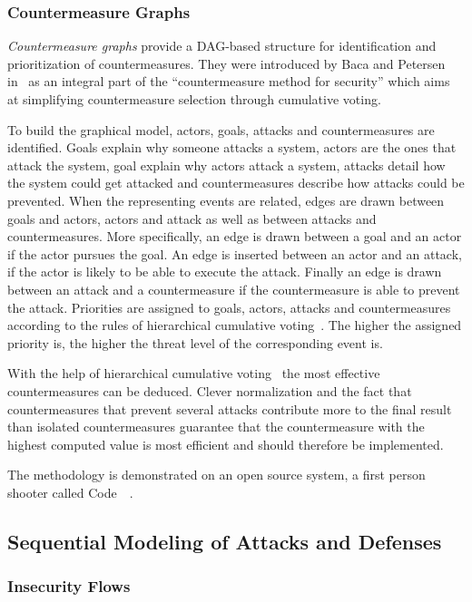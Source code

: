 \documentclass[a4paper]{article}
\begin{document}
\subsubsection{Countermeasure Graphs} 
\label{sec:countermeausre_graphs}

\emph{Countermeasure graphs} provide a DAG-based structure for identification
and prioritization of countermeasures. They were introduced by Baca and
Petersen~\cite{BaPe} in~ as an integral part of the ``countermeasure
method for security'' which aims at simplifying countermeasure selection through
cumulative voting.

To build the graphical model, actors, goals, attacks and countermeasures are
identified. Goals explain why someone attacks a system, actors are the ones 
that attack the system, goal explain why actors attack a system, attacks detail 
how the system could get attacked and countermeasures describe how attacks 
could be prevented. When the representing events are related, edges are drawn 
between goals and actors, actors and attack as well as between attacks and 
countermeasures. More specifically, an edge is drawn between a goal and an 
actor if the actor pursues the goal. An edge is inserted between an actor
and an attack, if the actor is likely to be able to execute the attack. Finally 
an edge is drawn between an attack and a countermeasure if the countermeasure 
is able to prevent the attack. Priorities are assigned to goals, actors, 
attacks and countermeasures according to the rules of hierarchical cumulative 
voting~\cite{BeSv}. The higher the assigned priority is, the higher the threat 
level of the corresponding event is.

With the help of hierarchical cumulative voting~\cite{BeSv} the most effective
countermeasures can be deduced. Clever normalization and the fact that
countermeasures that prevent several attacks contribute more to the final
result than isolated countermeasures guarantee that the countermeasure with
the highest computed value is most efficient and should therefore be
implemented.

The methodology is demonstrated on an open source system, a first person 
shooter called Code~~\cite{BaPe}.

\subsection{Sequential Modeling of Attacks and Defenses}
\label{sec:both_sequential}

\subsubsection{Insecurity Flows} 
\label{sec:insecurity_flows}
\end{document}
